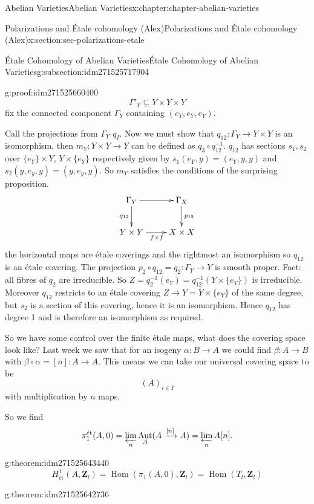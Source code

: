 \documentclass[oneside,10pt,]{book}
\numberwithin{equation}{section}
\newcommand{\lb}{[}
\newcommand{\rb}{]}
\newcommand{\ZZ}{\mathbf{Z}}
\newcommand{\et}{\mathrm{\acute{e}t}}
\DeclareMathOperator{\Hom}{Hom}
\DeclareMathOperator{\Aut}{Aut}
\begin{document}
\begin{chapterptx}{Abelian Varieties}{}{Abelian Varieties}{}{}{x:chapter:chapter-abelian-varieties}
\begin{sectionptx}{Polarizations and Étale cohomology (Alex)}{}{Polarizations and Étale cohomology (Alex)}{}{}{x:section:sec-polarizations-etale}
\begin{subsectionptx}{Étale Cohomology of Abelian Varieties}{}{Étale Cohomology of Abelian Varieties}{}{}{g:subsection:idm271525717904}
\begin{proofptx}{}{g:proof:idm271525660400}
\begin{equation*}
\Gamma'_Y \subseteq Y\times Y\times Y
\end{equation*}
fix the connected component \(\Gamma_Y\) containing \((e_Y,e_Y,e_Y)\).%
\par
Call the projections from \(\Gamma_Y\) \(q_I\). Now we must show that \(q_{12}\colon \Gamma_Y \to Y\times Y\) is an isomorphism, then \(m_Y\colon Y\times Y \to Y\) can be defined as \(q_3 \circ q_{12}^{-1}\). \(q_{12}\) has sections \(s_1,s_2\) over \(\{e_Y\}\times Y\), \(Y\times \{e_Y\}\) respectively given by \(s_1(e_Y,y) = (e_Y,y,y)\) and \(s_2(y,e_y,y) = (y,e_y,y)\). So \(m_Y\) satisfies the conditions of the surprising proposition.%
\begin{equation*}
\xymatrix{
\Gamma_Y \ar[r]\ar[d]_{q_{12}} & \Gamma_X\ar[d]^{p_{12}} \\
Y\times Y \ar[r]_{f\times f} & X\times X
}
\end{equation*}
the horizontal maps are étale coverings and the rightmost an isomorphism so \(q_{12}\) is an étale covering. The projection \(p_2 \circ q_{12} = q_2 \colon \Gamma_Y\to Y\) is smooth proper. Fact: all fibres of \(q_2\) are irreducible. So \(Z = q_2^{-1} (e_Y) = q_{12}^{-1}(Y\times \{e_Y\})\) is irreducible. Moreover \(q_{12}\) restricts to an étale covering \(Z \to Y = Y\times\{e_Y\}\) of  the same degree, but \(s_2\) is a section of this covering, hence it is an isomorphism. Hence \(q_{12}\) has degree 1 and is therefore an isomorphism as required.%
\end{proofptx}
So we have some control over the finite étale maps, what does the covering space look like? Last week we saw that for an isogeny \(\alpha\colon B \to A\) we could find \(\beta \colon A \to B\) with \(\beta\circ\alpha = \lb n\rb\colon A \to A\). This means we can take our universal covering space to be%
\begin{equation*}
(A)_{i\in I}
\end{equation*}
with multiplication by \(n\) maps.%
\par
So we find%
\begin{equation*}
\pi_1^\et(A,0) =\varprojlim_n \Aut_A(A\xrightarrow{[n]} A)=  \varprojlim_n A[n]\text{.}
\end{equation*}
%
\begin{theorem}{}{}{g:theorem:idm271525643440}%
%
\begin{equation*}
H^1_\et(A , \ZZ_l) = \Hom(\pi_1(A,0), \ZZ_l) = \Hom(T_l,\ZZ_l)
\end{equation*}
%
\end{theorem}
\begin{theorem}{}{}{g:theorem:idm271525642736}%

\end{theorem}
\end{subsectionptx}
\end{sectionptx}
\end{chapterptx}
\end{document}
